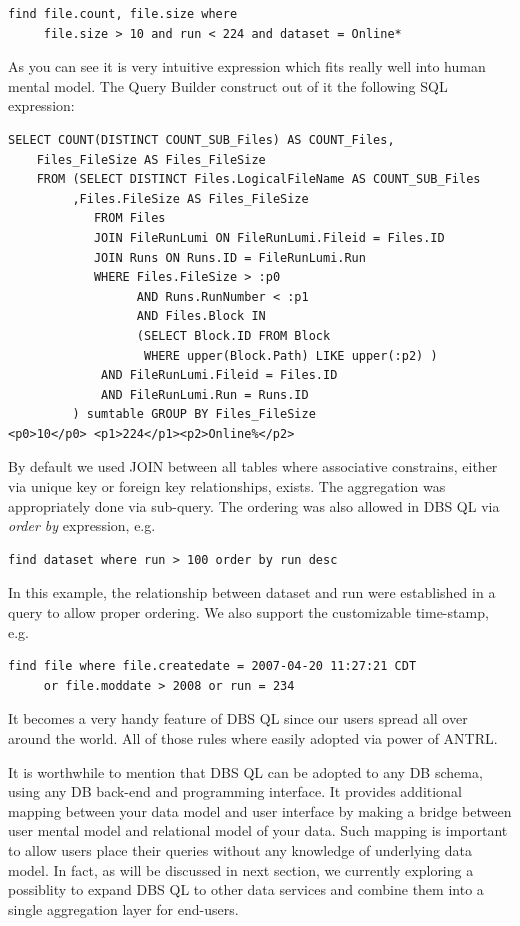 \documentclass[a4paper]{jpconf}
\begin{document}
\begin{verbatim}
find file.count, file.size where 
     file.size > 10 and run < 224 and dataset = Online*
\end{verbatim}

As you can see it is very intuitive expression which
fits really well into human mental model. The Query
Builder construct out of it the following SQL expression:

\begin{verbatim}
SELECT COUNT(DISTINCT COUNT_SUB_Files) AS COUNT_Files, 
    Files_FileSize AS Files_FileSize  
    FROM (SELECT DISTINCT Files.LogicalFileName AS COUNT_SUB_Files
         ,Files.FileSize AS Files_FileSize
            FROM Files
            JOIN FileRunLumi ON FileRunLumi.Fileid = Files.ID
            JOIN Runs ON Runs.ID = FileRunLumi.Run
            WHERE Files.FileSize > :p0 
                  AND Runs.RunNumber < :p1
                  AND Files.Block IN 
                  (SELECT Block.ID FROM Block 
                   WHERE upper(Block.Path) LIKE upper(:p2) )
             AND FileRunLumi.Fileid = Files.ID
             AND FileRunLumi.Run = Runs.ID
         ) sumtable GROUP BY Files_FileSize
<p0>10</p0> <p1>224</p1><p2>Online%</p2>

\end{verbatim}
By default we used JOIN between all tables where associative
constrains, either via unique key or foreign key relationships,
exists. The aggregation was appropriately done via sub-query.
The ordering was also allowed in DBS QL via {\it order by}
expression, e.g. 
\begin{verbatim}
find dataset where run > 100 order by run desc
\end{verbatim}
In this example, the relationship between dataset and run
were established in a query to allow proper ordering.
We also support the customizable time-stamp, e.g.
\begin{verbatim}
find file where file.createdate = 2007-04-20 11:27:21 CDT 
     or file.moddate > 2008 or run = 234
\end{verbatim}
It becomes a very handy feature of DBS QL since our
users spread all over around the world. All of those rules
where easily adopted via power of ANTRL.

It is worthwhile to mention that DBS QL can be adopted to
any DB schema, using any DB back-end and programming interface.
It provides additional mapping between your data model and
user interface by making a bridge between user mental model
and relational model of your data. Such mapping is important
to allow users place their queries without any knowledge of
underlying data model. 
In fact, as will be discussed in
next section, we currently exploring a possiblity to
expand DBS QL to other data services and combine them
into a single aggregation layer for end-users.
\end{document}

